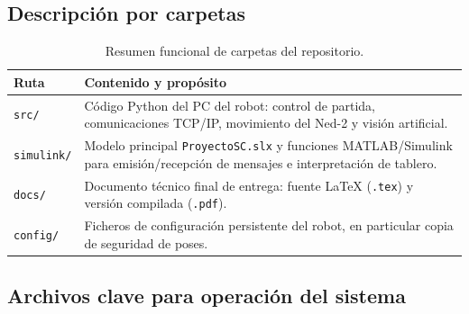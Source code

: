 \documentclass[12pt,a4paper]{article}
\begin{document}
\subsection{Descripción por carpetas}

\begin{table}[H]
\centering
\footnotesize
\begin{tabular}{P{0.18\textwidth} P{0.74\textwidth}}
\toprule
\textbf{Ruta} & \textbf{Contenido y propósito} \\
\midrule
\texttt{src/} & Código Python del PC del robot: control de partida, comunicaciones TCP/IP, movimiento del Ned-2 y visión artificial. \\
\texttt{simulink/} & Modelo principal \texttt{ProyectoSC.slx} y funciones MATLAB/Simulink para emisión/recepción de mensajes e interpretación de tablero. \\
\texttt{docs/} & Documento técnico final de entrega: fuente LaTeX (\texttt{.tex}) y versión compilada (\texttt{.pdf}). \\
\texttt{config/} & Ficheros de configuración persistente del robot, en particular copia de seguridad de poses. \\
\bottomrule
\end{tabular}
\caption{Resumen funcional de carpetas del repositorio.}
\end{table}

\subsection{Archivos clave para operación del sistema}
\end{document}
